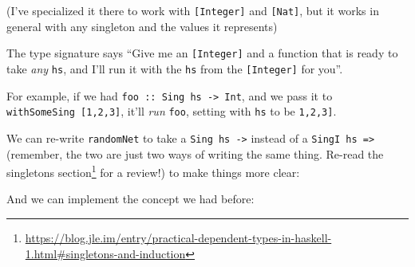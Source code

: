 \documentclass[]{article}
\newenvironment{Shaded}{}{}
\newcommand{\KeywordTok}[1]{\textcolor[rgb]{0.00,0.44,0.13}{\textbf{{#1}}}}
\newcommand{\DataTypeTok}[1]{\textcolor[rgb]{0.56,0.13,0.00}{{#1}}}
\newcommand{\CommentTok}[1]{\textcolor[rgb]{0.38,0.63,0.69}{\textit{{#1}}}}
\newcommand{\OtherTok}[1]{\textcolor[rgb]{0.00,0.44,0.13}{{#1}}}
\newcommand{\FunctionTok}[1]{\textcolor[rgb]{0.02,0.16,0.49}{{#1}}}
\newcommand{\NormalTok}[1]{{#1}}
\renewcommand{\href}[2]{#2\footnote{\url{#1}}}
\begin{document}
(I've specialized it there to work with \texttt{{[}Integer{]}} and
\texttt{{[}Nat{]}}, but it works in general with any singleton and the values it
represents)

The type signature says ``Give me an \texttt{{[}Integer{]}} and a function that
is ready to take \emph{any} \texttt{hs}, and I'll run it with the \texttt{hs}
from the \texttt{{[}Integer{]}} for you''.

For example, if we had \texttt{foo\ ::\ Sing\ hs\ -\textgreater{}\ Int}, and we
pass it to \texttt{withSomeSing\ {[}1,2,3{]}}, it'll \emph{run} \texttt{foo},
setting with \texttt{hs} to be \texttt{\textquotesingle{}{[}1,2,3{]}}.

We can re-write \texttt{randomNet} to take a \texttt{Sing\ hs\ -\textgreater{}}
instead of a \texttt{SingI\ hs\ =\textgreater{}} (remember, the two are just two
ways of writing the same thing. Re-read the
\href{https://blog.jle.im/entry/practical-dependent-types-in-haskell-1.html\#singletons-and-induction}{singletons
section} for a review!) to make things more clear:

\begin{Shaded}
\end{Shaded}

And we can implement the concept we had before:
\end{document}
